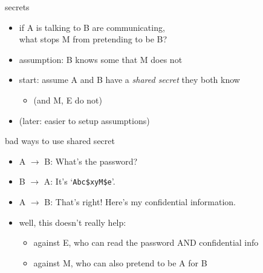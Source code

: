 \begin{frame}{secrets}
    \begin{itemize}
    \item if A is talking to B are communicating, \\
        what stops M from pretending to be B?
    \vspace{.5cm}
    \item assumption: B knows some  that M does not
    \vspace{.5cm}
    \item<2-> start: assume A and B have a \textit{shared secret} they both know
        \begin{itemize}
        \item (and M, E do not)
        \end{itemize}
    \item<2-> (later: easier to setup assumptions)
    \end{itemize}
\end{frame}

\begin{frame}{bad ways to use shared secret}
    \begin{itemize}
    \item A $\rightarrow$ B: What's the password?
    \item B $\rightarrow$ A: It's `\texttt{Abc\$xyM\$e}'.
    \item A $\rightarrow$ B: That's right! Here's my confidential information.
    \vspace{.5cm}
    \item<2-> well, this doesn't really help: 
        \begin{itemize}
        \item against E, who can read the password AND confidential info
        \item against M, who can also pretend to be A for B
        \end{itemize}
    \end{itemize}
\end{frame}
